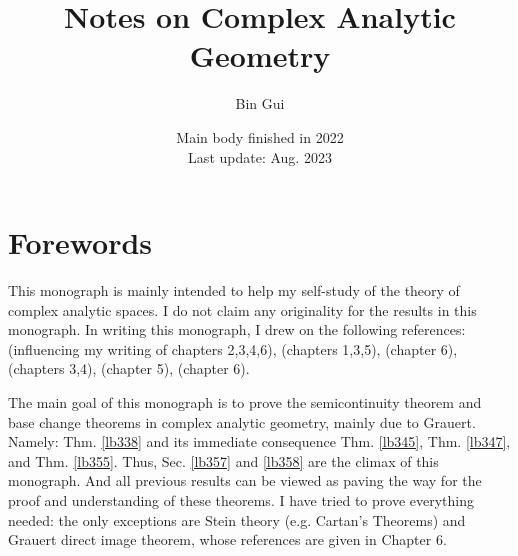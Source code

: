 \documentclass[12pt,b5paper,notitlepage]{report}
\title{Notes on Complex Analytic Geometry}
\author{{\sc Bin Gui}
}
\date{\footnotesize Main body finished in 2022\\Last update: Aug. 2023}
\theoremstyle{definition}
\theoremstyle{plain}
\numberwithin{equation}{section}
\begin{document}
\sloppy %
	\setcounter{page}{1}
	\setcounter{section}{-1}
	






	
	\maketitle



\makeatletter
\newcommand*{\toccontents}{}
\makeatother
\toccontents



	


\newpage


\chapter*{Forewords}

This monograph is mainly intended to help my self-study of the theory of complex analytic spaces. I do not claim any originality for the results in this monograph. In writing this monograph, I drew on the following references: \cite{GR-b} (influencing my writing of chapters 2,3,4,6), \cite{Fis} (chapters 1,3,5), \cite{BS} (chapter 6), \cite{GPR} (chapters 3,4), \cite{Vak17} (chapter 5), \cite{Dem} (chapter 6).

The main goal of this monograph is to prove the semicontinuity theorem and base change theorems in complex analytic geometry, mainly due to Grauert. Namely: Thm. \ref{lb338} and its immediate consequence Thm. \ref{lb345}, Thm. \ref{lb347}, and Thm. \ref{lb355}. Thus, Sec. \ref{lb357} and \ref{lb358} are the climax of this monograph. And all previous results can be viewed as paving the way for the proof and  understanding of these theorems. I have tried to prove everything needed: the only exceptions are Stein theory (e.g. Cartan's Theorems) and Grauert direct image theorem, whose references are given in Chapter 6. 
\end{document}
